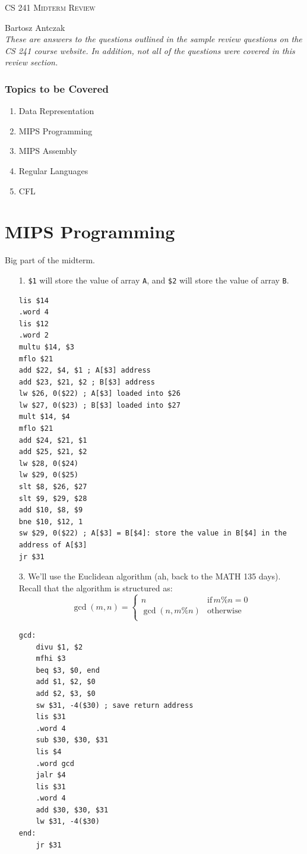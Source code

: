 \documentclass{report}
\begin{document}
\begin{center}
\begin{Large}
\textsc{CS 241 Midterm Review}\\
\end{Large}
Bartosz Antczak\\
\textit{These are answers to the questions outlined in the sample review questions on the CS 241 course website. In addition, not all of the questions were covered in this review section.}
\end{center} 
\subsubsection{Topics to be Covered}
\begin{enumerate}
\item Data Representation
\item MIPS Programming
\item MIPS Assembly
\item Regular Languages
\item CFL
\end{enumerate}

\section{MIPS Programming}
Big part of the midterm.
\begin{itemize}
\item[1.] \texttt{\$1} will store the value of array \texttt{A}, and \texttt{\$2} will store the value of array \texttt{B}.
\begin{lstlisting}
lis $14
.word 4
lis $12
.word 2
multu $14, $3
mflo $21
add $22, $4, $1 ; A[$3] address
add $23, $21, $2 ; B[$3] address
lw $26, 0($22) ; A[$3] loaded into $26
lw $27, 0($23) ; B[$3] loaded into $27
mult $14, $4
mflo $21
add $24, $21, $1
add $25, $21, $2
lw $28, 0($24)
lw $29, 0($25)
slt $8, $26, $27
slt $9, $29, $28
add $10, $8, $9
bne $10, $12, 1
sw $29, 0($22) ; A[$3] = B[$4]: store the value in B[$4] in the address of A[$3]
jr $31
\end{lstlisting}
\item[3.] We'll use the Euclidean algorithm (ah, back to the MATH 135 days). Recall that the algorithm is structured as:
$$
\gcd(m,n)=
\begin{cases}
n & \mathrm{if}\, m\%n = 0\\
\gcd(n, m\%n) & \text{otherwise}\\
\end{cases}
$$
\begin{lstlisting}
gcd:
	divu $1, $2
	mfhi $3
	beq $3, $0, end
	add $1, $2, $0
	add $2, $3, $0
	sw $31, -4($30) ; save return address
	lis $31
	.word 4
	sub $30, $30, $31
	lis $4
	.word gcd
	jalr $4
	lis $31
	.word 4
	add $30, $30, $31
	lw $31, -4($30)
end:
	jr $31
\end{lstlisting}
\end{itemize}
\end{document}
